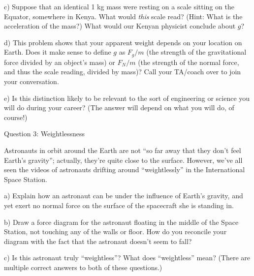 \documentclass[12pt]{article}
\begin{document}
\vspace{2in}
\newpage
c) Suppose that an identical 1 kg mass were resting on a scale sitting on the Equator, somewhere in Kenya. What would {\it this} scale read? (Hint: What is the acceleration of the mass?) What would our Kenyan physicist conclude about $g$?

\vspace{2in}

d) This problem shows that your apparent weight depends on your location on Earth. 
Does it make sense to define $g$ as $F_g/m$ 
(the strength of the gravitational force divided by an object's mass) or
$F_N/m$ (the strength of the normal force, and thus the scale reading, divided by mass)? Call your TA/coach over to join your conversation.

\vspace{3in}

e) Is this distinction likely to be relevant to the sort of engineering or science you will do during your
career? (The answer will depend on what you will do, of course!)


%
%
%
%
%
%
%
%
%
%
%
\newpage
\centerline{\Large Question 3: Weightlessness}

Astronauts in orbit around the Earth are not ``so far away that they don't feel Earth's gravity'';
actually, they’re quite close to the surface. However, we’ve all seen the videos of astronauts drifting
around ``weightlessly'' in the International Space Station.

a) Explain how an astronaut can be under the influence of Earth's gravity, and yet exert no normal
force on the surface of the spacecraft she is standing in.

\vspace{2in}

b) Draw a force diagram for the astronaut floating in the middle of the Space Station, not touching
any of the walls or floor. How do you reconcile your diagram with the fact that the astronaut
doesn't seem to fall?

\vspace{2in}

c) Is this astronaut truly ``weightless''? What does ``weightless'' mean? (There are multiple correct answers to both of these questions.)

\newpage
\end{document}
